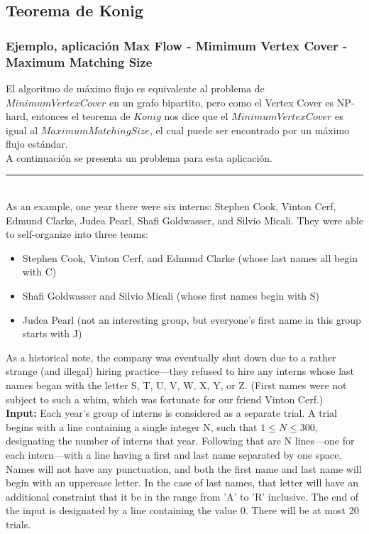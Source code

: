 \documentclass[10pt,letterpaper,twocolumn]{article}
\begin{document}
	\subsection{Teorema de Konig}
		\subsubsection{Ejemplo, aplicación Max Flow - Mimimum Vertex Cover - Maximum Matching Size}
		El algoritmo de máximo flujo es equivalente al problema de $Minimum Vertex Cover$ en un grafo bipartito, pero como el Vertex Cover es NP-hard, entonces el teorema de $Konig$ nos dice que el $Minimum Vertex Cover$ es igual al $Maximum Matching Size$, el cual puede ser encontrado por un máximo flujo estándar.\\
		A continuación se presenta un problema para esta aplicación.\\
\rule{12cm}{.1pt}\\
		As an example, one year there were six interns: Stephen Cook, Vinton Cerf, Edmund Clarke, Judea Pearl, Shafi Goldwasser, and Silvio Micali. They were able to self-organize into three teams:
		\begin{itemize}
			\item Stephen Cook, Vinton Cerf, and Edmund Clarke (whose last names all begin with C)
			\item Shafi Goldwasser and Silvio Micali (whose first names begin with S)
			\item Judea Pearl (not an interesting group, but everyone's first name in this group starts with J)
		\end{itemize}
As a historical note, the company was eventually shut down due to a rather strange (and illegal) hiring practice---they refused to hire any interns whose last names began with the letter S, T, U, V, W, X, Y, or Z. (First names were not subject to such a whim, which was fortunate for our friend Vinton Cerf.)\\
\textbf{Input:}  Each year's group of interns is considered as a separate trial. A trial begins with a line containing a single integer N, such that $1 \leq N \leq 300$, designating the number of interns that year. Following that are N lines---one for each intern---with a line having a first and last name separated by one space. Names will not have any punctuation, and both the first name and last name will begin with an uppercase letter. In the case of last names, that letter will have an additional constraint that it be in the range from 'A' to 'R' inclusive. The end of the input is designated by a line containing the value 0. There will be at most 20 trials.\\
\end{document}
